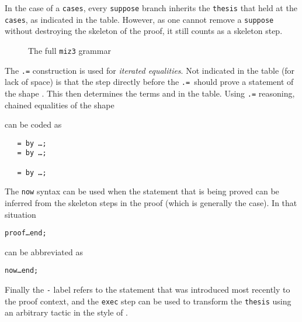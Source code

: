 \documentclass{LMCS}
\let\xmedskip=\medskip
\begin{document}
In the case of a \texttt{cases}, every \texttt{suppose} branch
inherits the \texttt{thesis} that held at the \texttt{cases}, as indicated in the table.
However, as one cannot remove a \texttt{suppose} without destroying
the skeleton of the proof, it still counts as a skeleton step.

\begin{figure}
\vspace{2em}

\caption{The full \texttt{miz3} grammar}
\label{grammar}
\vspace{2em}
\end{figure}

The \texttt{.=} construction is used for \emph{iterated equalities}.
Not indicated in the table (for lack of space) is that the step directly before the
\texttt{.=}\,
should prove a statement of the shape .
This then determines the terms  and  in the table.
Using \texttt{.=} reasoning, chained equalities of the shape

can be coded as
\xmedskip
\begin{flushleft}\tt
\ \  =  by {\rm\dots}; \\
\ \ \phantom{} =  by {\rm\dots}; \\
\ \ \phantom{} \llap{\rlap{\rm\dots}\phantom{\tt .}} \\
\ \ \phantom{} =  by {\rm\dots};
\end{flushleft}
\xmedskip
\noindent
{}
The \texttt{now} syntax can be used when the statement that is
being proved can be inferred from the skeleton steps
in the proof (which is generally the case).
In that situation
\xmedskip
\begingroup
\def\form{}
\def\xdots{\dots}
\begin{alltt}
  \form proof \xdots end;
\end{alltt}
\xmedskip
\noindent
can be abbreviated as
\xmedskip
\begin{alltt}
  now \xdots end;
\end{alltt}
\endgroup
\xmedskip
\noindent
Finally the \texttt{-} label refers to the statement that was introduced most recently to the proof context,
and the \texttt{exec} step can be used to transform the \texttt{thesis} using an arbitrary tactic in the style of \cite{wie:01}.
\end{document}
